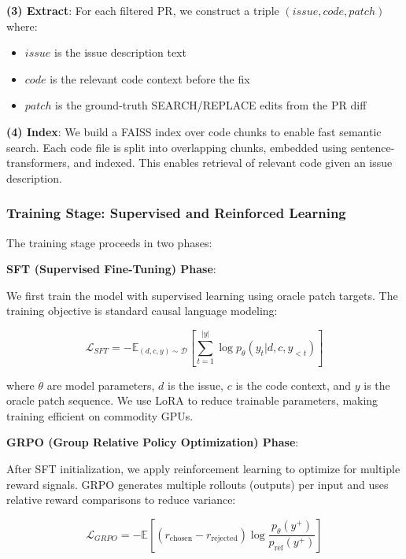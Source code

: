 \documentclass{article} %
\begin{document}
\textbf{(3) Extract}: For each filtered PR, we construct a triple $(issue, code, patch)$ where:
\begin{itemize}
    \item $issue$ is the issue description text
    \item $code$ is the relevant code context before the fix
    \item $patch$ is the ground-truth SEARCH/REPLACE edits from the PR diff
\end{itemize}

\textbf{(4) Index}: We build a FAISS index over code chunks to enable fast semantic search. Each code file is split into overlapping chunks, embedded using sentence-transformers, and indexed. This enables retrieval of relevant code given an issue description.

\subsubsection{Training Stage: Supervised and Reinforced Learning}

The training stage proceeds in two phases:

\textbf{SFT (Supervised Fine-Tuning) Phase}:

We first train the model with supervised learning using oracle patch targets. The training objective is standard causal language modeling:

\begin{equation}
\mathcal{L}_{SFT} = -\mathbb{E}_{(d,c,y) \sim \mathcal{D}} \left[ \sum_{t=1}^{|y|} \log p_\theta(y_t | d, c, y_{<t}) \right]
\end{equation}

where $\theta$ are model parameters, $d$ is the issue, $c$ is the code context, and $y$ is the oracle patch sequence. We use LoRA \citep{hu2021lora} to reduce trainable parameters, making training efficient on commodity GPUs.

\textbf{GRPO (Group Relative Policy Optimization) Phase}:

After SFT initialization, we apply reinforcement learning to optimize for multiple reward signals. GRPO generates multiple rollouts (outputs) per input and uses relative reward comparisons to reduce variance:

\begin{equation}
\mathcal{L}_{GRPO} = -\mathbb{E} \left[ (r_{\text{chosen}} - r_{\text{rejected}}) \log \frac{p_\theta(y^+)}{p_{\text{ref}}(y^+)} \right]
\end{equation}
\end{document}
